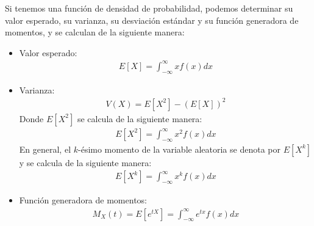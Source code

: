 \documentclass{article}
\theoremstyle{definition}
\theoremstyle{plain}
\theoremstyle{remark}
\begin{document}
Si tenemos una función de densidad de probabilidad, podemos determinar su valor esperado, su varianza, su desviación estándar y su función generadora de momentos, y se calculan de la siguiente manera:

\begin{itemize}
\item Valor esperado:
\begin{align*}
E[X] = \int_{-\infty}^{\infty} x f(x) dx
\end{align*}
\item Varianza:
\begin{align*}
V(X) = E[X^2] - (E[X])^2
\end{align*}
Donde $E[X^2]$ se calcula de la siguiente manera:
\begin{align*}
E[X^2] = \int_{-\infty}^{\infty} x^2 f(x) dx
\end{align*}
En general, el $k$-ésimo momento de la variable aleatoria se denota por $E[X^k]$ y se calcula de la siguiente manera:
\begin{align*}
E[X^k] = \int_{-\infty}^{\infty} x^k f(x) dx
\end{align*}
\item Función generadora de momentos:
\begin{align*}
M_X(t) = E[e^{tX}] = \int_{-\infty}^{\infty} e^{tx} f(x) dx
\end{align*}
\end{itemize}
\end{document}
